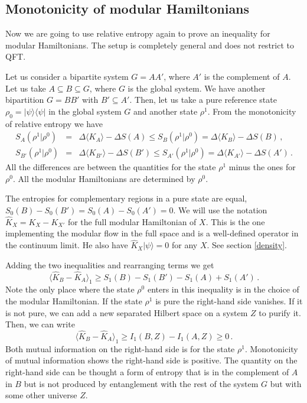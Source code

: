 \documentclass[12pt]{article}
\numberwithin{equation}{section}
\newcommand\eea{\end{eqnarray}}
\newcommand\bea{\begin{eqnarray}}
\newcommand{\be}{\begin{equation}}
\newcommand{\ee}{\end{equation}}
\begin{document}
\subsection{Monotonicity of modular Hamiltonians}

Now we are going to use relative entropy again to prove an inequality for modular Hamiltonians. The setup is completely general and does not restrict to QFT.

Let us consider a bipartite system $G=AA'$, where $A'$ is the complement of $A$. Let us take $A\subseteq B\subseteq G$, where $G$ is the global system. We have another bipartition $G=BB'$ with $B'\subseteq A'$.  Then, let us take a pure reference state $\rho_0=|\psi\rangle\langle \psi|$ in the global system $G$ and another state $\rho^1$.  
From the monotonicity of relative entropy we have
\bea
S_A(\rho^1|\rho^0) &=& \Delta \langle K_A\rangle -\Delta S(A)\le  S_B(\rho^1|\rho^0)= \Delta \langle K_B\rangle -\Delta S(B)\,,\\
S_{B'}(\rho^1|\rho^0) &=& \Delta \langle K_{B'}\rangle -\Delta S(B')\le  S_{A'}(\rho^1|\rho^0)= \Delta \langle K_{A'}\rangle -\Delta S(A')\,.
\eea
All the differences are between the quantities for the state $\rho^1$ minus the ones for $\rho^0$. All the modular Hamiltonians are determined by $\rho^0$. 

The entropies for complementary regions in a pure state are equal, $S_0(B)- S_0(B')=S_0(A)- S_0(A')=0$. We will use the notation $\hat{K}_X=K_X-K_{X'}$ for the full modular Hamiltonian of $X$. This is the one implementing the modular flow in the full space and is a well-defined operator in the continuum limit. He also have $\hat{K}_X |\psi\rangle=0$ for any $X$. See section \ref{density}. 
 
Adding the two inequalities and rearranging terms we get
\be
\langle \hat{K}_B-\hat{K}_A\rangle_1 \ge  S_1(B)- S_1(B')- S_1(A)+ S_1(A')\,.\label{pos1}
\ee
Note the only place where the state $\rho^0$ enters in this inequality is in the choice of the modular Hamiltonian. If the state $\rho^1$ is pure the right-hand side vanishes. If it is not pure, we can add a new separated Hilbert space on a system $Z$ to purify it. Then, we can write 
\be
\langle \hat{K}_B-\hat{K}_A\rangle_1 \ge  I_1(B,Z)-I_1(A,Z)\ge 0\,.\label{pos}
\ee
Both mutual information on the right-hand side is for the state $\rho^1$. Monotonicity of mutual information shows the right-hand side is positive. The quantity on the right-hand side can be thought a form of entropy that is in the complement of $A$ in $B$ but is not produced by entanglement with the rest of the system $G$ but with some other universe $Z$.  
\end{document}
